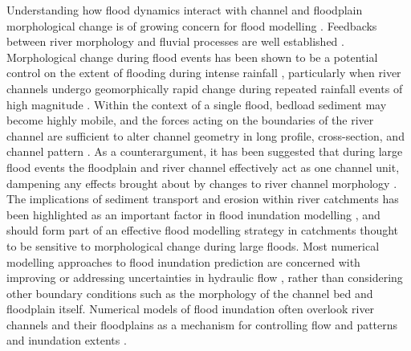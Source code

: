 Understanding how flood dynamics interact with channel and floodplain morphological change is of growing concern for flood modelling \citep{fewtrell2011geometric}. Feedbacks between river morphology and fluvial processes are well established \citep{schumm1979geomorphic,sear2010guidebook}. Morphological change during flood events has been shown to be a potential control on the extent of flooding during intense rainfall \citep{stover2001channel,wong2015sensitivity}, particularly when river channels undergo geomorphically rapid change during repeated rainfall events of high magnitude \citep{slater2016extent}. Within the context of a single flood, bedload sediment may become highly mobile, and the forces acting on the boundaries of the river channel are sufficient to alter channel geometry in long profile, cross-section, and channel pattern \citep{kleinhans2013splitting,wong2015sensitivity}. As a counterargument, it has been suggested that during large flood events the floodplain and river channel effectively act as one channel unit, dampening any effects brought about by changes to river channel morphology \citep{bates2005numerical}. The implications of sediment transport and erosion within river catchments has been highlighted as an important factor in flood inundation modelling \citep{lane2007interactions,lane2008reconceptualising,neuhold2009incorporating}, and should form part of an effective flood modelling strategy \citep{wong2015sensitivity} in catchments thought to be sensitive to morphological change during large floods. Most numerical modelling approaches to flood inundation prediction are concerned with improving or addressing uncertainties in hydraulic flow \citep{galland1991telemac,bates2000simple}, rather than considering other boundary conditions such as the morphology of the channel bed and floodplain itself. Numerical models of flood inundation often overlook river channels and their floodplains as a mechanism for controlling flow and patterns and inundation extents \citep{neuhold2009incorporating}.


